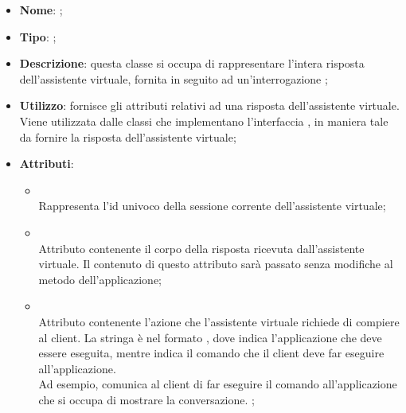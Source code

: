 \begin{itemize}
	\item \textbf{Nome}: ;
	\item \textbf{Tipo}: ;
	\item \textbf{Descrizione}: questa classe si occupa di rappresentare l'intera risposta dell'assistente virtuale, fornita in seguito ad un'interrogazione ;
	\item \textbf{Utilizzo}: fornisce gli attributi relativi ad una risposta dell'assistente virtuale. Viene utilizzata dalle classi che implementano l'interfaccia , in maniera tale da fornire la risposta dell'assistente virtuale;
	\item \textbf{Attributi}:
	\begin{itemize}
		\item[]  \\
		Rappresenta l'id univoco della sessione corrente dell'assistente virtuale;
		\item[]  \\
		Attributo contenente il corpo della risposta ricevuta dall'assistente virtuale. Il contenuto di questo attributo sarà passato senza modifiche al metodo  dell'applicazione;
		\item[]  \\
		Attributo contenente l'azione che l'assistente virtuale richiede di compiere al client. La stringa è nel formato , dove  indica l'applicazione che deve essere eseguita, mentre  indica il comando che il client deve far eseguire all'applicazione. \\
Ad esempio,  comunica al client di far eseguire il comando  all'applicazione che si occupa di mostrare la conversazione.  ;
	\end{itemize}
\end{itemize}
\FloatBarrier

